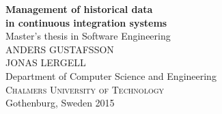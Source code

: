 
\begin{titlepage}
			
\addtolength{\voffset}{2cm}


\mbox{}
\vfill
\renewcommand{\familydefault}{\sfdefault} \normalfont %
\textbf{{\Huge Management of historical data \\[0.2cm] in continuous integration systems }}\\[0.5cm]
Master's thesis in Software Engineering \\[0.5cm]

{\Large ANDERS GUSTAFSSON\\[0.3cm] JONAS LERGELL}\\[2.5cm]

Department of Computer Science and Engineering \\
\textsc{Chalmers University of Technology} \\
Gothenburg, Sweden 2015

\renewcommand{\familydefault}{\rmdefault} \normalfont %
\end{titlepage}


\newpage
\restoregeometry
\thispagestyle{empty}
\mbox{}


